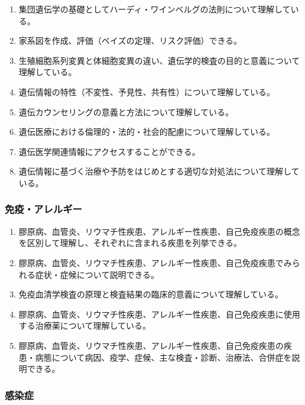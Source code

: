 \begin{enumerate}
\def\labelenumi{\arabic{enumi}.}
\tightlist
\item
  集団遺伝学の基礎としてハーディ・ワインベルグの法則について理解している。
\item
  家系図を作成、評価（ベイズの定理、リスク評価）できる。
\item
  生殖細胞系列変異と体細胞変異の違い、遺伝学的検査の目的と意義について理解している。
\item
  遺伝情報の特性（不変性、予見性、共有性）について理解している。
\item
  遺伝カウンセリングの意義と方法について理解している。
\item
  遺伝医療における倫理的・法的・社会的配慮について理解している。
\item
  遺伝医学関連情報にアクセスすることができる。
\item
  遺伝情報に基づく治療や予防をはじめとする適切な対処法について理解している。
\end{enumerate}

\hypertarget{ux514dux75abux30a2ux30ecux30ebux30aeux30fc}{%
\subsubsection{免疫・アレルギー}\label{ux514dux75abux30a2ux30ecux30ebux30aeux30fc}}

\begin{enumerate}
\def\labelenumi{\arabic{enumi}.}
\tightlist
\item
  膠原病、血管炎、リウマチ性疾患、アレルギー性疾患、自己免疫疾患の概念を区別して理解し、それぞれに含まれる疾患を列挙できる。
\item
  膠原病、血管炎、リウマチ性疾患、アレルギー性疾患、自己免疫疾患でみられる症状・症候について説明できる。
\item
  免疫血清学検査の原理と検査結果の臨床的意義について理解している。
\item
  膠原病、血管炎、リウマチ性疾患、アレルギー性疾患、自己免疫疾患に使用する治療薬について理解している。
\item
  膠原病、血管炎、リウマチ性疾患、アレルギー性疾患、自己免疫疾患の疾患・病態について病因、疫学、症候、主な検査・診断、治療法、合併症を説明できる。
\end{enumerate}

\hypertarget{ux611fux67d3ux75c7}{%
\subsubsection{感染症}\label{ux611fux67d3ux75c7}}

